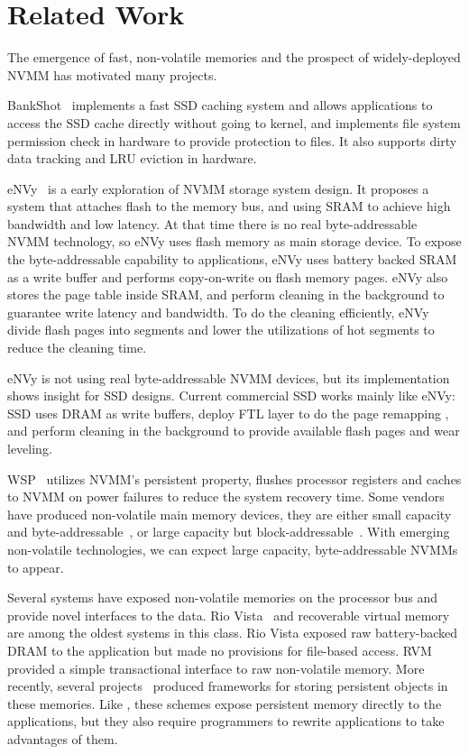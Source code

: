\section{Related Work} 
\label{sec:related}

The emergence of fast, non-volatile memories and the prospect of
widely-deployed NVMM has motivated many projects.

BankShot~\cite{BankShot} implements a fast SSD caching system
and allows applications to access the SSD cache directly without going to
kernel, and implements file system permission check in hardware to provide
protection to files. It also supports dirty data tracking and LRU eviction
in hardware.

eNVy~\cite{eNVy} is a early exploration of NVMM storage system design.
It proposes a system that attaches flash to the memory
bus, and using SRAM to achieve high bandwidth and low latency. At that time
there is no real byte-addressable NVMM technology, so eNVy uses flash memory
as main storage device. To expose the byte-addressable capability to 
applications, eNVy uses battery backed SRAM as a write buffer and performs
copy-on-write on flash memory pages. eNVy also stores the page table inside
SRAM, and perform cleaning in the background to guarantee write latency and
bandwidth. To do the cleaning efficiently, eNVy divide flash pages into
segments and lower the utilizations of hot segments to reduce the cleaning
time.

eNVy is not using real byte-addressable NVMM devices, but its implementation
shows insight for SSD designs. Current commercial SSD works mainly like
eNVy: SSD uses DRAM as write buffers, deploy FTL layer to do the page remapping
, and perform cleaning in the background to provide available flash pages
and wear leveling.

WSP~\cite{WSP} utilizes NVMM's persistent property, flushes processor registers
and caches to NVMM on power failures to reduce the system recovery time.
Some vendors have produced non-volatile main memory devices, they are
either small capacity and byte-addressable~\cite{micron-nvdimm},
or large capacity but block-addressable~\cite{smart-system}.
With emerging non-volatile technologies, we can expect
large capacity, byte-addressable NVMMs to appear.

Several systems have exposed non-volatile memories on the processor bus
and provide novel interfaces to the data. Rio Vista~\cite{riovista} and
recoverable virtual memory~\cite{RVM} are among the oldest systems in this
class. Rio Vista exposed raw battery-backed DRAM to the application but made
no provisions for file-based access. RVM provided a simple transactional
interface to raw non-volatile memory.  More recently, several projects~\cite{nvtm,
mnemosyne,hpnvdata} produced frameworks for storing persistent objects
in these memories. Like \Chell{}, these schemes expose persistent memory directly
to the applications, but they also require programmers to rewrite applications
to take advantages of them.

